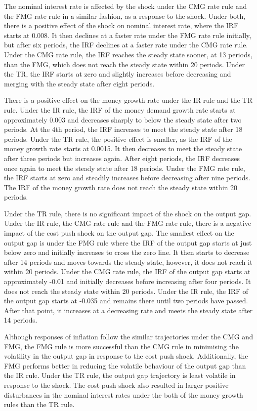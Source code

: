 \documentclass[11pt,preprint, authoryear]{elsarticle}
\numberwithin{equation}{section}
\numberwithin{figure}{section}
\numberwithin{table}{section}
\begin{document}
The nominal interest rate is affected by the shock under the CMG rate
rule and the FMG rate rule in a similar fashion, as a response to the
shock. Under both, there is a positive effect of the shock on nominal
interest rate, where the IRF starts at 0.008. It then declines at a
faster rate under the FMG rate rule initially, but after six periods,
the IRF declines at a faster rate under the CMG rate rule. Under the CMG
rate rule, the IRF reaches the steady state sooner, at 13 periods, than
the FMG, which does not reach the steady state within 20 periods. Under
the TR, the IRF starts at zero and slightly increases before decreasing
and merging with the steady state after eight periods.

There is a positive effect on the money growth rate under the IR rule
and the TR rule. Under the IR rule, the IRF of the money demand growth
rate starts at approximately 0.003 and decreases sharply to below the
steady state after two periods. At the 4th period, the IRF increases to
meet the steady state after 18 periods. Under the TR rule, the positive
effect is smaller, as the IRF of the money growth rate starts at 0.0015.
It then decreases to meet the steady state after three periods but
increases again. After eight periods, the IRF decreases once again to
meet the steady state after 18 periods. Under the FMG rate rule, the IRF
starts at zero and steadily increases before decreasing after nine
periods. The IRF of the money growth rate does not reach the steady
state within 20 periods.

Under the TR rule, there is no significant impact of the shock on the
output gap. Under the IR rule, the CMG rate rule and the FMG rate rule,
there is a negative impact of the cost push shock on the output gap. The
smallest effect on the output gap is under the FMG rule where the IRF of
the output gap starts at just below zero and initially increases to
cross the zero line. It then starts to decrease after 14 periods and
moves towards the steady state, however, it does not reach it within 20
periods. Under the CMG rate rule, the IRF of the output gap starts at
approximately -0.01 and initially decreases before increasing after four
periods. It does not reach the steady state within 20 periods. Under the
IR rule, the IRF of the output gap starts at -0.035 and remains there
until two periods have passed. After that point, it increases at a
decreasing rate and meets the steady state after 14 periods.

Although responses of inflation follow the similar trajectories under
the CMG and FMG, the FMG rule is more successful than the CMG rule in
minimising the volatility in the output gap in response to the cost push
shock. Additionally, the FMG performs better in reducing the volatile
behaviour of the output gap than the IR rule. Under the TR rule, the
output gap trajectory is least volatile in response to the shock. The
cost push shock also resulted in larger positive disturbances in the
nominal interest rates under the both of the money growth rules than the
TR rule.
\end{document}
